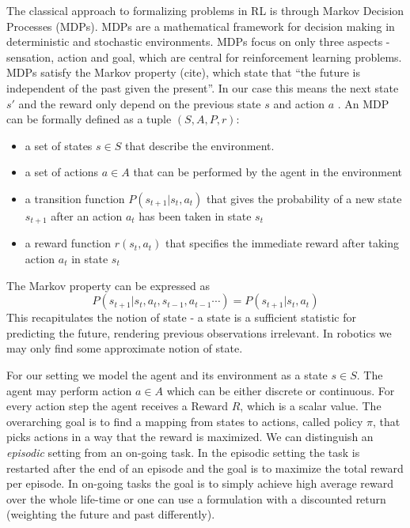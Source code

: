 The classical approach to formalizing problems in RL is through
Markov Decision Processes (MDPs).
MDPs are a mathematical
framework for decision making in deterministic and stochastic environments.
MDPs focus on only three aspects
- sensation, action and goal, which are central
for reinforcement learning problems.
MDPs satisfy the Markov property (cite), which state that ``the future is independent
of the past given the present''. In our case this means the next state $s'$ and the reward
only depend on the previous state $s$ and action $a$ \citet{sutton1992reinforcement}.
An MDP can be formally defined as a tuple $(S, A, P, r)$:

\begin{itemize}
\item a set of states $s \in S$ that describe the environment.
\item a set of actions $a \in A$ that can be performed by the agent in the environment
\item a transition function $P(s_{t+1} | s_t, a_t)$ that gives the probability of a new
  state $s_{t+1}$ after an action $a_t$ has been taken in state $s_t$
\item a reward function $r(s_t, a_t)$ that specifies the immediate reward after taking action
  $a_t$ in state $s_t$
\end{itemize}

The Markov property can be expressed as
$$ P(s_{t+1} | s_t, a_t, s_{t-1}, a_{t-1}\cdots) = P(s_{t+1} | s_t, a_t) $$
This recapitulates the notion of state - a state is a sufficient statistic
for predicting the future, rendering previous observations irrelevant.
In robotics we may only find some approximate notion of state.

For our setting we model the agent and its environment as a state $s \in S$. The agent
may perform action $ a \in A$ which can be either discrete or continuous.
For every action step the agent receives a Reward $R$,
which is a scalar value.
The overarching goal is to find a mapping from states to actions,
called policy $\pi$, that picks actions in a way that
the reward is maximized.
We can distinguish an \textit{episodic} setting
from an on-going task.
In the episodic setting
the task is restarted after
the end of an episode and the goal is
to maximize the total reward per episode.
In on-going tasks the goal
is to simply achieve high average reward over
the whole life-time or one can use a formulation
with a discounted return (weighting the
future and past differently).

